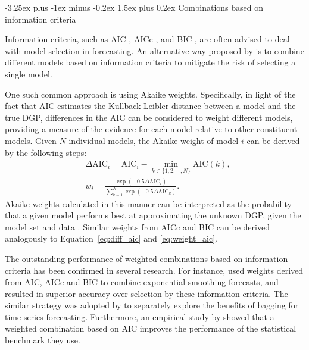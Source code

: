 \documentclass[11pt]{article}
\makeatletter
\renewcommand{\paragraph}{\@startsection{paragraph}{4}{0ex}%
   {-3.25ex plus -1ex minus -0.2ex}%
   {1.5ex plus 0.2ex}%
   {\normalfont\normalsize\bfseries}}
\makeatother
\begin{document}
\paragraph{Combinations based on information criteria}

Information criteria, such as AIC \citep[Akaike’s Information Criterion,]{Akaike1974-ya}, AICc \citep{Sugiura1978-xm}, and BIC \citep[Bayes Information Criterion,][]{Schwarz1978-cz}, are often advised to deal with model selection in forecasting. An alternative way proposed by \cite{Burnham2002-us} is to combine different models based on information criteria to mitigate the risk of selecting a single model.

One such common approach is using Akaike weights. Specifically, in light of the fact that AIC estimates the Kullback-Leibler distance \citep{Kullback1951-hl} between a model and the true DGP, differences in the AIC can be considered to weight different models, providing a measure of the evidence for each model relative to other constituent models. Given $N$ individual models, the Akaike weight of model $i$ can be derived by the following steps:
\begin{align}
&\Delta \mathrm{AIC}_{i}=\mathrm{AIC}_{i}-\min _{k \in \{1,2,\cdots,N\}} \mathrm{AIC}(k), \label{eq:diff_aic}\\
&w_{i}=\frac{\exp (-0.5 \Delta \mathrm{AIC}_{i})}{\sum_{k=1}^{N} \exp \left(-0.5 \Delta \mathrm{AIC}_{k}\right)}. \label{eq:weight_aic}
\end{align}
Akaike weights calculated in this manner can be interpreted as the probability that a given model performs best at approximating the unknown DGP, given the model set and data \citep{Kolassa2011-ai}. Similar weights from AICc and BIC can be derived analogously to Equation~\eqref{eq:diff_aic} and \eqref{eq:weight_aic}.

The outstanding performance of weighted combinations based on information criteria has been confirmed in several research. For instance, \cite{Kolassa2011-ai} used weights derived from AIC, AICc and BIC to combine exponential smoothing forecasts, and resulted in superior accuracy over selection by these information criteria. The similar strategy was adopted by \cite{Petropoulos2018-fw} to separately explore the benefits of bagging for time series forecasting. Furthermore, an empirical study by \cite{Petropoulos2018-ad} showed that a weighted combination based on AIC improves the performance of the statistical benchmark they use.

\end{document}
